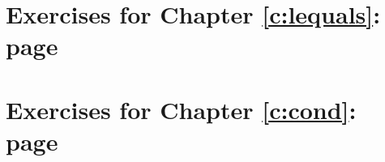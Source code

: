 {%

 \section*{Exercises for Chapter \ref{c:lequals}: page \pageref{ex:lequals}} \label{ans:lequals}





\section*{Exercises for Chapter \ref{c:cond}: page \pageref{ex:cond}} \label{ans:cond}

}
